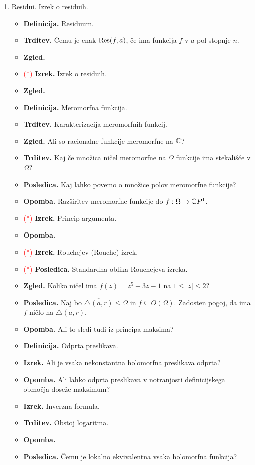 \begin{enumerate}
    \item Residui. Izrek o residuih.
    \begin{itemize}
        \item \textbf{Definicija.} Residuum.
        \item \textbf{Trditev.} Čemu je enak \(\operatorname{Res}(f, a)\), če ima funkcija \(f\) v \(a\) pol stopnje \(n\).
        \item \textbf{Zgled.} 
        \item \textcolor{red}{(*)} \textbf{Izrek.} Izrek o residuih.
        \item \textbf{Zgled.} 
        \item \textbf{Definicija.} Meromorfna funkcija. 
        \item \textbf{Trditev.} Karakterizacija meromorfnih funkcij.
        \item \textbf{Zgled.} Ali so racionalne funkcije meromorfne na \(\mathbb{C}\)?
        \item \textbf{Trditev.} Kaj če množica ničel meromorfne na \(\Omega\) funkcije ima stekališče v \(\Omega\)?
        \item \textbf{Posledica.} Kaj lahko povemo o množice polov meromorfne funkcije?
        \item \textbf{Opomba.} Razširitev meromorfne funkcije do \(f: \Omega \to \mathbb{C} P^1\).
        \item \textcolor{red}{(*)} \textbf{Izrek.} Princip argumenta.
        \item \textbf{Opomba.} \todo{}
        \item \textcolor{red}{(*)} \textbf{Izrek.} Rouchejev (Rouche) izrek.
        \item \textcolor{red}{(*)} \textbf{Posledica.} Standardna oblika Rouchejeva izreka.
        \item \textbf{Zgled.} Koliko ničel ima \(f(z) = z^5 + 3z - 1\) na \(1 \leq |z| \leq 2\)?
        \item \textbf{Posledica.} Naj bo \(\overline{\triangle(a, r)} \leq \Omega\) in \(f \subseteq O(\Omega)\). Zadosten pogoj, da ima \(f\) ničlo na \(\triangle(a, r)\).
        \item \textbf{Opomba.} Ali to sledi tudi iz principa maksima?
        \item \textbf{Definicija.} Odprta preslikava.
        \item \textbf{Izrek.} Ali je vsaka nekonstantna holomorfna preslikava odprta?
        \item \textbf{Opomba.} Ali lahko odprta preslikava v notranjosti definicijskega območja doseže maksimum?
        \item \textbf{Izrek.} Inverzna formula.
        \item \textbf{Trditev.} Obstoj logaritma.
        \item \textbf{Opomba.} \todo{}
        \item \textbf{Posledica.} Čemu je lokalno ekvivalentna vsaka holomorfna funkcija? 
    \end{itemize}
\end{enumerate}

